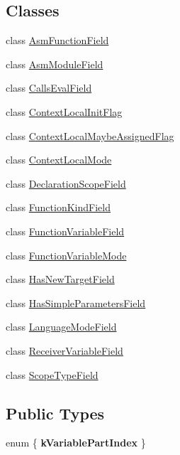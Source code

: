 \subsection*{Classes}
\begin{DoxyCompactItemize}
\item 
class \hyperlink{classv8_1_1internal_1_1_scope_info_1_1_asm_function_field}{Asm\+Function\+Field}
\item 
class \hyperlink{classv8_1_1internal_1_1_scope_info_1_1_asm_module_field}{Asm\+Module\+Field}
\item 
class \hyperlink{classv8_1_1internal_1_1_scope_info_1_1_calls_eval_field}{Calls\+Eval\+Field}
\item 
class \hyperlink{classv8_1_1internal_1_1_scope_info_1_1_context_local_init_flag}{Context\+Local\+Init\+Flag}
\item 
class \hyperlink{classv8_1_1internal_1_1_scope_info_1_1_context_local_maybe_assigned_flag}{Context\+Local\+Maybe\+Assigned\+Flag}
\item 
class \hyperlink{classv8_1_1internal_1_1_scope_info_1_1_context_local_mode}{Context\+Local\+Mode}
\item 
class \hyperlink{classv8_1_1internal_1_1_scope_info_1_1_declaration_scope_field}{Declaration\+Scope\+Field}
\item 
class \hyperlink{classv8_1_1internal_1_1_scope_info_1_1_function_kind_field}{Function\+Kind\+Field}
\item 
class \hyperlink{classv8_1_1internal_1_1_scope_info_1_1_function_variable_field}{Function\+Variable\+Field}
\item 
class \hyperlink{classv8_1_1internal_1_1_scope_info_1_1_function_variable_mode}{Function\+Variable\+Mode}
\item 
class \hyperlink{classv8_1_1internal_1_1_scope_info_1_1_has_new_target_field}{Has\+New\+Target\+Field}
\item 
class \hyperlink{classv8_1_1internal_1_1_scope_info_1_1_has_simple_parameters_field}{Has\+Simple\+Parameters\+Field}
\item 
class \hyperlink{classv8_1_1internal_1_1_scope_info_1_1_language_mode_field}{Language\+Mode\+Field}
\item 
class \hyperlink{classv8_1_1internal_1_1_scope_info_1_1_receiver_variable_field}{Receiver\+Variable\+Field}
\item 
class \hyperlink{classv8_1_1internal_1_1_scope_info_1_1_scope_type_field}{Scope\+Type\+Field}
\end{DoxyCompactItemize}
\subsection*{Public Types}
\begin{DoxyCompactItemize}
\item 
enum \{ {\bfseries k\+Variable\+Part\+Index}
 \}\hypertarget{classv8_1_1internal_1_1_scope_info_a3dd04932d73e9848a515f12713f80008}{}\label{classv8_1_1internal_1_1_scope_info_a3dd04932d73e9848a515f12713f80008}

\end{DoxyCompactItemize}
